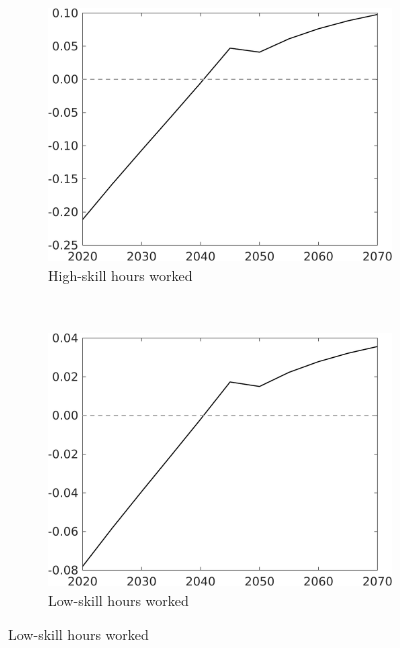 \begin{figure}[h!!!]
\vspace{3mm}	
	\begin{subfigure}{0.4\textwidth}
		\caption{High-skill hours worked}
		\includegraphics[width=1\textwidth]{../../codding_model/own_basedOnFried/optimalPol_010922_revision/figures/all_13Sept22_Tplus30/CountTAUFPerDif_Opt_target_hh_nsk0_xgr0_knspil0_regime4_spillover0_sep0_extern0_PV1_etaa0.79.png}
	\end{subfigure}
\begin{minipage}[]{0.1\textwidth}
\
\end{minipage}	
	\begin{subfigure}{0.4\textwidth}
		\caption{Low-skill hours worked}
		\includegraphics[width=1\textwidth]{../../codding_model/own_basedOnFried/optimalPol_010922_revision/figures/all_13Sept22_Tplus30/CountTAUFPerDif_Opt_target_hl_nsk0_xgr0_knspil0_regime4_spillover0_sep0_extern0_PV1_etaa0.79.png}

\end{subfigure}
\end{figure}
